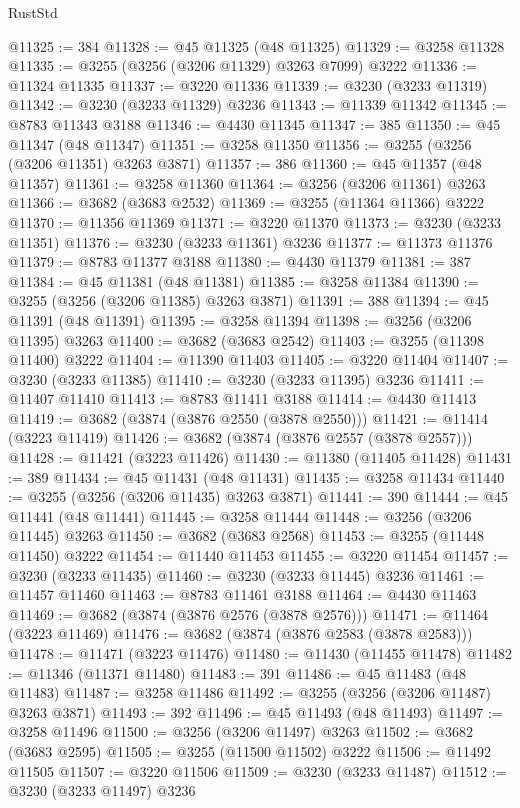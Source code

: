 \begin{lexlean}{RustStd}
\begin{coremodule}
{\begin{coremodule}
{{{{{{{{{{{{{{{{{{{{{{{{{{{{{{{{{{{{{@11325 := 384
@11328 := @45 @11325 (@48 @11325)
@11329 := @3258 @11328
@11335 := @3255 (@3256 (@3206 @11329) @3263 @7099) @3222
@11336 := @11324 @11335
@11337 := @3220 @11336
@11339 := @3230 (@3233 @11319)
@11342 := @3230 (@3233 @11329) @3236
@11343 := @11339 @11342
@11345 := @8783 @11343 @3188
@11346 := @4430 @11345
@11347 := 385
@11350 := @45 @11347 (@48 @11347)
@11351 := @3258 @11350
@11356 := @3255 (@3256 (@3206 @11351) @3263 @3871)
@11357 := 386
@11360 := @45 @11357 (@48 @11357)
@11361 := @3258 @11360
@11364 := @3256 (@3206 @11361) @3263
@11366 := @3682 (@3683 @2532)
@11369 := @3255 (@11364 @11366) @3222
@11370 := @11356 @11369
@11371 := @3220 @11370
@11373 := @3230 (@3233 @11351)
@11376 := @3230 (@3233 @11361) @3236
@11377 := @11373 @11376
@11379 := @8783 @11377 @3188
@11380 := @4430 @11379
@11381 := 387
@11384 := @45 @11381 (@48 @11381)
@11385 := @3258 @11384
@11390 := @3255 (@3256 (@3206 @11385) @3263 @3871)
@11391 := 388
@11394 := @45 @11391 (@48 @11391)
@11395 := @3258 @11394
@11398 := @3256 (@3206 @11395) @3263
@11400 := @3682 (@3683 @2542)
@11403 := @3255 (@11398 @11400) @3222
@11404 := @11390 @11403
@11405 := @3220 @11404
@11407 := @3230 (@3233 @11385)
@11410 := @3230 (@3233 @11395) @3236
@11411 := @11407 @11410
@11413 := @8783 @11411 @3188
@11414 := @4430 @11413
@11419 := @3682 (@3874 (@3876 @2550 (@3878 @2550)))
@11421 := @11414 (@3223 @11419)
@11426 := @3682 (@3874 (@3876 @2557 (@3878 @2557)))
@11428 := @11421 (@3223 @11426)
@11430 := @11380 (@11405 @11428)
@11431 := 389
@11434 := @45 @11431 (@48 @11431)
@11435 := @3258 @11434
@11440 := @3255 (@3256 (@3206 @11435) @3263 @3871)
@11441 := 390
@11444 := @45 @11441 (@48 @11441)
@11445 := @3258 @11444
@11448 := @3256 (@3206 @11445) @3263
@11450 := @3682 (@3683 @2568)
@11453 := @3255 (@11448 @11450) @3222
@11454 := @11440 @11453
@11455 := @3220 @11454
@11457 := @3230 (@3233 @11435)
@11460 := @3230 (@3233 @11445) @3236
@11461 := @11457 @11460
@11463 := @8783 @11461 @3188
@11464 := @4430 @11463
@11469 := @3682 (@3874 (@3876 @2576 (@3878 @2576)))
@11471 := @11464 (@3223 @11469)
@11476 := @3682 (@3874 (@3876 @2583 (@3878 @2583)))
@11478 := @11471 (@3223 @11476)
@11480 := @11430 (@11455 @11478)
@11482 := @11346 (@11371 @11480)
@11483 := 391
@11486 := @45 @11483 (@48 @11483)
@11487 := @3258 @11486
@11492 := @3255 (@3256 (@3206 @11487) @3263 @3871)
@11493 := 392
@11496 := @45 @11493 (@48 @11493)
@11497 := @3258 @11496
@11500 := @3256 (@3206 @11497) @3263
@11502 := @3682 (@3683 @2595)
@11505 := @3255 (@11500 @11502) @3222
@11506 := @11492 @11505
@11507 := @3220 @11506
@11509 := @3230 (@3233 @11487)
@11512 := @3230 (@3233 @11497) @3236
}}}}}}}}}}}}}}}}}}}}}}}}}}}}}}}}}}}}}
\end{coremodule}}
\end{coremodule}
\end{lexlean}
